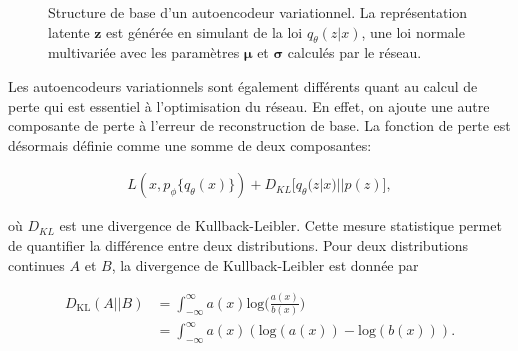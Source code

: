 \begin{figure}[ht]
	\caption{Structure de base d'un autoencodeur variationnel. La représentation latente $\boldsymbol{z}$ est générée en simulant de la loi $q_{\theta}(z|x)$,  une loi normale multivariée avec les paramètres $\boldsymbol{\mu}$ et $\boldsymbol{\sigma}$ calculés par le réseau.}
	\label{fig:VAEstructure}
\end{figure}

Les autoencodeurs variationnels sont également différents quant au calcul de perte qui est essentiel à l'optimisation du réseau. En effet, on ajoute une autre composante de perte à l'erreur de reconstruction de base. La fonction de perte est désormais définie comme une somme de deux composantes:

\begin{gather}  \label{eq:loss_vae}
L(x, p_\phi\{q_\theta(x)\}) + D_{KL}\big[q_\theta(z|x) || p(z)\big],
\end{gather}


où $D_{KL}$ est une divergence de Kullback-Leibler. Cette mesure statistique permet de quantifier la différence entre deux distributions. Pour deux distributions continues $A$ et $B$, la divergence de Kullback-Leibler est donnée par

\begin{equation}  \label{eq:kl}
	\begin{aligned}
		D_{\text{KL}}(A || B) &= \int_{-\infty}^{\infty} a(x) \text{log} \Big(\frac{a(x)}{b(x)}\Big)  \\
		 &= \int_{-\infty}^{\infty} a(x) (\text{log}(a(x)) - \text{log}(b(x))).
	\end{aligned}
\end{equation}


